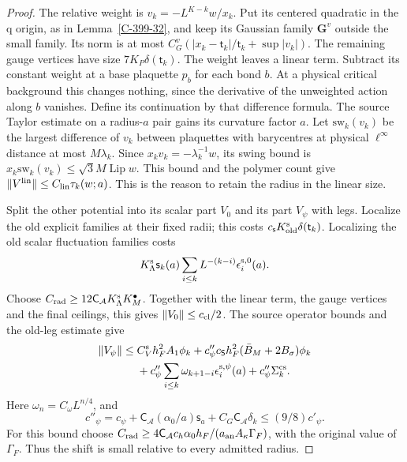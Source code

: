 \documentclass[11pt,letterpaper,reqno]{amsart}
\theoremstyle{definition}
\theoremstyle{remark}
\begin{document}
\begin{proof}
The relative weight is $v_k=-L^{K-k}w/x_k$.
Put its centered quadratic in the q origin, as in
Lemma~\ref{C-399-32}, and keep its Gaussian family
$\mathbf G^v$ outside the small family. Its norm is at most
$C_G^v(|x_k-\mathsf t_k|/\mathsf t_k+\sup|v_k|)$.
The remaining gauge vertices have size
$7K_P\delta(\mathsf t_k)$.
The weight leaves a linear term. Subtract its constant
weight at a base plaquette $p_b$ for each bond $b$.
At a physical critical background this changes nothing,
since the derivative of the unweighted action along $b$
vanishes. Define its continuation by that difference
formula. The source Taylor estimate on a radius-$a$ pair
gains its curvature factor $a$. Let $\mathrm{sw}_k(v_k)$ be the
largest difference of $v_k$ between plaquettes with barycentres
at physical $\ell^\infty$ distance at most $M\lambda_k$.
Since $x_kv_k=-\lambda_k^{-1}w$, its swing bound is
$x_k\mathrm{sw}_k(v_k)\le\sqrt3M\operatorname{Lip}w$.
This bound and the polymer count give
$\|V^{\rm lin}\|\le C_{\rm lin}\tau_k(w;a)$.
This is the reason to retain the radius in the linear size.

Split the other potential into its scalar part $V_0$ and
its part $V_\psi$ with legs. Localize the old explicit
families at their fixed radii; this costs
$c_{\mathsf s}K_{\rm old}^{\rm s}\delta(\mathsf t_k)$.
Localizing the old scalar fluctuation families costs
\[
 K_\Lambda^{\rm s}\mathsf s_k(a)
 \sum_{i\le k}L^{-(k-i)}\epsilon_i^{{\rm s},0}(a).
\]
Choose $C_{\rm rad}\ge12\mathsf C_{\mathcal A}K_\Lambda^{\rm s}K_M^\bullet$.
Together with the linear term, the gauge vertices and the
final ceilings, this gives $\|V_0\|\le c_{\rm cl}/2$.
The source operator bounds and the old-leg estimate give
\begin{equation}\label{eq:qcd-source-leg-input}
\begin{split}
 \|V_\psi\|\le{}&C_V^{\rm s}h_F^2A_1\phi_k
 +c''_\psi c_{\mathsf S}h_F^2(\bar B_M+2B_\sigma)\phi_k\\
 &+c''_\psi\sum_{i\le k}\omega_{k+1-i}
                           \epsilon_i^{{\rm s},\psi}(a)
 +c''_\psi\Sigma_k^{\rm cs}.
\end{split}
\end{equation}
Here $\omega_n=C_\omega L^{n/4}$, and
\[
 c''_\psi=c_\psi+\mathsf C_{\mathcal A}(\alpha_0/a)\mathsf s_a
       +C_G\mathsf C_{\mathcal A}\delta_k\le(9/8)c'_\psi.
\]
For this bound choose
$C_{\rm rad}\ge4\mathsf C_{\mathcal A}c_h\alpha_0h_F/(a_{\rm an}A_\kappa\Gamma_F)$,
with the original value of $\Gamma_F$.
Thus the shift is small relative to every admitted radius.


\end{proof}
\end{document}
